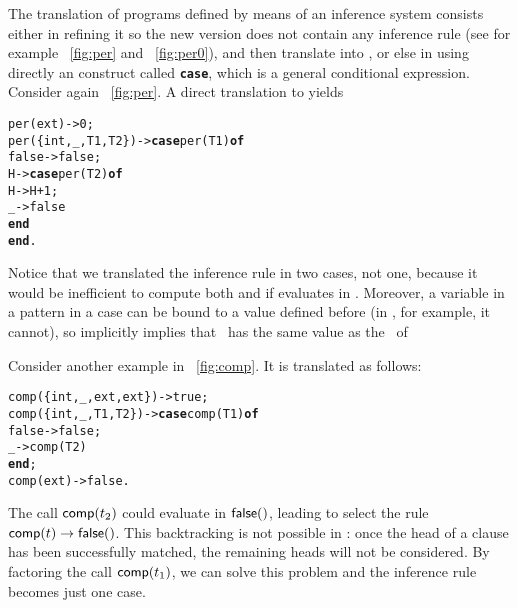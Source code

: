 The translation of programs defined by means of an inference system
consists either in refining it so the new version does not contain any
inference rule (see for example \fig~\vref{fig:per} and
\fig~\ref{fig:per0}), and then translate into \Erlang, or else in
using directly an \Erlang construct called \texttt{\textbf{case}},
which is a general conditional expression. Consider again
\fig~\vref{fig:per}. A direct translation to \Erlang yields
\begin{alltt}
per(ext)           -> 0;
per(\{int,\_,T1,T2\}) -> \textbf{case} per(T1) \textbf{of}
                        false -> false;
                            H -> \textbf{case} per(T2) \textbf{of}
                                   H -> H + 1;
                                   \_ -> false
                                 \textbf{end}
                      \textbf{end}.
\end{alltt}
Notice that we translated the inference rule in two cases, not one,
because it would be inefficient to compute both  and
 if  evaluates in
. Moreover, a variable in a pattern in a case can be
bound to a value defined before (in \OCaml, for example, it cannot),
so  implicitly
implies that~ has the same value as the~ of

Consider another example in \fig~\vref{fig:comp}. It is translated as follows:
\begin{alltt}
comp(\{int,\_,ext,ext\}) -> true;
comp(\{int,\_,T1,T2\})   -> \textbf{case} comp(T1) \textbf{of}
                           false -> false;
                               \_ -> comp(T2)
                         \textbf{end};
comp(ext)             -> false.
\end{alltt}
The call \(\textsf{comp}(t_2)\) could evaluate in \(\textsf{false}()\),
leading to select the rule \(\textsf{comp}(t) \rightarrow
\textsf{false}()\). This backtracking is not possible in \Erlang: once
the head of a clause has been successfully matched, the remaining
heads will not be considered. By factoring the call
\(\textsf{comp}(t_1)\), we can solve this problem and the inference rule
becomes just one case.

